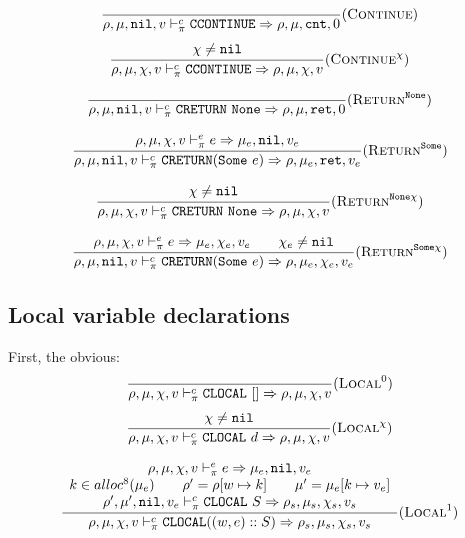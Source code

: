 \[\dfrac{
}{\rho,\mu,\texttt{nil},v \vdash_\pi^c \texttt{CCONTINUE} \Rightarrow \rho,\mu,\texttt{cnt},0} (\textsc{Continue})\]
\[\dfrac{\begin{array}{c}
    \chi\ne\texttt{nil}
\end{array}}{\rho,\mu,\chi,v \vdash_\pi^c \texttt{CCONTINUE} \Rightarrow \rho,\mu,\chi,v} (\textsc{Continue}^\chi)\]

\[\dfrac{
}{\rho,\mu,\texttt{nil},v \vdash_\pi^c \texttt{CRETURN}\ \texttt{None} \Rightarrow \rho,\mu,\texttt{ret},0} (\textsc{Return}^{\texttt{None}})\]

\[\dfrac{\begin{array}{c}
    \rho,\mu,\chi,v \vdash_\pi^e e \Rightarrow \mu_e,\texttt{nil},v_e
\end{array}}{\rho,\mu,\texttt{nil},v \vdash_\pi^c \texttt{CRETURN}(\texttt{Some}\ e) \Rightarrow \rho,\mu_e,\texttt{ret},v_e} (\textsc{Return}^{\texttt{Some}})\]

\[\dfrac{\begin{array}{c}
    \chi\ne\texttt{nil}
\end{array}}{\rho,\mu,\chi,v \vdash_\pi^c \texttt{CRETURN}\ \texttt{None} \Rightarrow \rho,\mu,\chi,v} (\textsc{Return}^{\texttt{None}\chi})\]

\[\dfrac{\begin{array}{c}
    \rho,\mu,\chi,v \vdash_\pi^e e \Rightarrow \mu_e,\chi_e,v_e \qquad \chi_e\ne\texttt{nil}
\end{array}}{\rho,\mu,\texttt{nil},v \vdash_\pi^c \texttt{CRETURN}(\texttt{Some}\ e) \Rightarrow \rho,\mu_e,\chi_e,v_e} (\textsc{Return}^{\texttt{Some}\chi})\]

\subsection{Local variable declarations}

First, the obvious:
\[\dfrac{\begin{array}{c}
\end{array}}{\rho,\mu,\chi,v \vdash_\pi^c \texttt{CLOCAL}\ [] \Rightarrow \rho,\mu,\chi,v} (\textsc{Local}^0)\]
\[\dfrac{\begin{array}{c}
    \chi\ne\texttt{nil}
\end{array}}{\rho,\mu,\chi,v \vdash_\pi^c \texttt{CLOCAL}\ d \Rightarrow \rho,\mu,\chi,v} (\textsc{Local}^\chi)\]

\[\dfrac{\begin{array}{c}
    \rho,\mu,\chi,v \vdash_\pi^e e \Rightarrow \mu_e,\texttt{nil},v_e \\
    k \in alloc^8(\mu_e) \qquad \rho' = \rho[w \mapsto k] \qquad \mu' = \mu_e[k \mapsto v_e] \\
    \rho',\mu',\texttt{nil},v_e \vdash_\pi^c \texttt{CLOCAL}\ S \Rightarrow \rho_s,\mu_s,\chi_s,v_s
\end{array}}{\rho,\mu,\chi,v \vdash_\pi^c \texttt{CLOCAL}((w,e)::S) \Rightarrow \rho_s,\mu_s,\chi_s,v_s} (\textsc{Local}^1)\]

